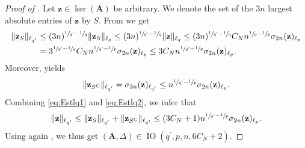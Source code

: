 \documentclass[11pt,reqno, a4paper]{article}
\numberwithin{equation}{section}
\begin{document}
\begin{proof}[Proof of ]
Let $\mathbf{z}\in\ker(\mathbf{A})$ be arbitrary.
We denote the set of the $3n$ largest absolute entries of $\mathbf{z}$ by $S$.
From  we get
\begin{align}\label{eq:Estlq1}
\begin{split}
\lVert\mathbf{z}_S\rVert_{\ell_{q'}}&\leq(3n)^{\sfrac{1}{q'}-\sfrac{1}{q}}\lVert\mathbf{z}_S\rVert_{\ell_q}\leq(3n)^{\sfrac{1}{q'}-\sfrac{1}{q}}\lVert\mathbf{z}\rVert_{\ell_q}\leq(3n)^{\sfrac{1}{q'}-\sfrac{1}{q}} C_Nn^{\sfrac{1}{q}-\sfrac{1}{p}}\sigma_{2n}(\mathbf{z})_{\ell_p}\\
&=3^{\sfrac{1}{q'}-\sfrac{1}{q}}C_N n^{\sfrac{1}{q'}-\sfrac{1}{p}}\sigma_{2n}(\mathbf{z})_{\ell_p}\leq 3C_N n^{\sfrac{1}{q'}-\sfrac{1}{p}}\sigma_{2n}(\mathbf{z})_{\ell_p}.
\end{split}
\end{align}
Moreover,  yields
\begin{gather}\label{eq:Estlq2}
    \lVert\mathbf{z}_{S^\mathrm{C}}\rVert_{\ell_{q'}}=\sigma_{3n}(\mathbf{z})_{\ell_{q'}}\leq n^{\sfrac{1}{q'}-\sfrac{1}{p}}\sigma_{2n}(\mathbf{z})_{\ell_p}.
\end{gather}
Combining \eqref{eq:Estlq1} and \eqref{eq:Estlq2}, we infer that
\begin{gather}
   \lVert\mathbf{z}\rVert_{\ell_{q'}}\leq\lVert\mathbf{z}_S\rVert_{\ell_{q'}}+\lVert\mathbf{z}_{S^\mathrm{C}}\rVert_{\ell_{q'}}\leq(3C_N+1)n^{\sfrac{1}{q'}-\sfrac{1}{p}}\sigma_{2n}(\mathbf{z})_{\ell_p}. 
\end{gather}
Using again , we thus get $(\mathbf{A},\Delta)\in\operatorname{IO}(q^\prime,p,n,6C_N + 2)$.
\end{proof}
\end{document}

